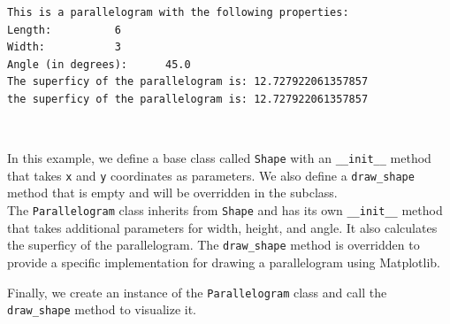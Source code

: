 \documentclass[11pt]{article}
\begin{document}
    \begin{Verbatim}[commandchars=\\\{\}]
This is a parallelogram with the following properties:
Length:          6
Width:           3
Angle (in degrees):      45.0
The superficy of the parallelogram is: 12.727922061357857
the superficy of the parallelogram is: 12.727922061357857
    \end{Verbatim}

    \begin{center}
    \end{center}
    { \hspace*{\fill} \\}
    
    In this example, we define a base class called \texttt{Shape} with an
\texttt{\_\_init\_\_} method that takes \texttt{x} and \texttt{y}
coordinates as parameters. We also define a \texttt{draw\_shape} method
that is empty and will be overridden in the subclass.\\
The \texttt{Parallelogram} class inherits from \texttt{Shape} and has
its own \texttt{\_\_init\_\_} method that takes additional parameters
for width, height, and angle. It also calculates the superficy of the
parallelogram. The \texttt{draw\_shape} method is overridden to provide
a specific implementation for drawing a parallelogram using Matplotlib.

Finally, we create an instance of the \texttt{Parallelogram} class and
call the \texttt{draw\_shape} method to visualize it.
\end{document}
